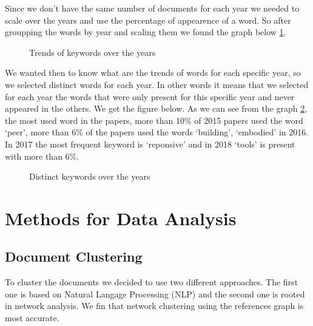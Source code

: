 \documentclass[article,twocolumn]{IEEEtran}
\begin{document}
    Since we don't have the same number of documents for each year we needed
to scale over the years and use the percentage of appearence of a word.
So after groupping the words by year and scaling them we found the graph
below \ref{fig1}.


    \begin{figure}
        \begin{center}\end{center}
        \caption{Trends of keywords over the years}
        \label{fig1}
    \end{figure}
    
    We wanted then to know what are the trends of words for each specific
year, so we selected distinct words for each year. In other words it
means that we selected for each year the words that were only present
for this specific year and never appeared in the others. We get the
figure below. As we can see from the graph \ref{fig2}, the most used
word in the papers, more than 10\% of 2015 papers used the word `peer',
more than 6\% of the papers used the words `building', `embodied' in
2016. In 2017 the most frequent keyword is `reponsive' and in 2018
`tools' is present with more than 6\%.


    \begin{figure}
        \begin{center}\end{center}
        \caption{Distinct keywords over the years}
        \label{fig2}
    \end{figure}
    
    \hypertarget{methods-for-data-analysis}{%
\section{Methods for Data Analysis}\label{methods-for-data-analysis}}

    \hypertarget{document-clustering}{%
\subsection{Document Clustering}\label{document-clustering}}

To cluster the documents we decided to use two different approaches. The
first one is based on Natural Langage Processing (NLP) and the second
one is rooted in network analysis. We fin that network clustering using
the references graph is most accurate.
\end{document}
